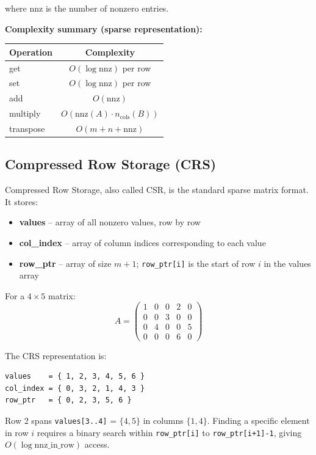 where $\text{nnz}$ is the number of nonzero entries.

\textbf{Complexity summary (sparse representation):}
\begin{center}
\begin{tabular}{lc}
\toprule
Operation & Complexity \\
\midrule
get & $O(\log \text{nnz})$ per row \\
set & $O(\log \text{nnz})$ per row \\
add & $O(\text{nnz})$ \\
multiply & $O(\text{nnz}(A) \cdot n_{\text{cols}}(B))$ \\
transpose & $O(m + n + \text{nnz})$ \\
\bottomrule
\end{tabular}
\end{center}

\subsection{Compressed Row Storage (CRS)}

Compressed Row Storage, also called CSR, is the standard sparse matrix format. It stores:
\begin{itemize}
\item \textbf{values} -- array of all nonzero values, row by row
\item \textbf{col\_index} -- array of column indices corresponding to each value
\item \textbf{row\_ptr} -- array of size $m+1$; \texttt{row\_ptr[i]} is the start of row $i$ in the values array
\end{itemize}

For a $4 \times 5$ matrix:
\[
A = \begin{pmatrix} 1 & 0 & 0 & 2 & 0 \\ 0 & 0 & 3 & 0 & 0 \\ 0 & 4 & 0 & 0 & 5 \\ 0 & 0 & 0 & 6 & 0 \end{pmatrix}
\]

The CRS representation is:
\begin{lstlisting}
values    = { 1, 2, 3, 4, 5, 6 }
col_index = { 0, 3, 2, 1, 4, 3 }
row_ptr   = { 0, 2, 3, 5, 6 }
\end{lstlisting}

Row 2 spans \texttt{values[3..4]} = $\{4, 5\}$ in columns $\{1, 4\}$. Finding a specific element in row $i$ requires a binary search within \texttt{row\_ptr[i]} to \texttt{row\_ptr[i+1]-1}, giving $O(\log \text{nnz\_in\_row})$ access.


